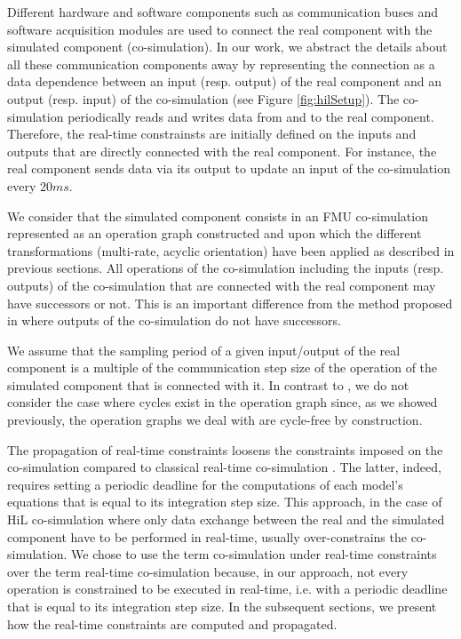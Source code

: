 Different hardware and software components such as communication buses and software acquisition modules are used to connect the real component with the simulated component (co-simulation). In our work, we abstract the details about all these communication components away by representing the connection as a data dependence between an input (resp. output) of the real component and an output (resp. input) of the co-simulation (see Figure \ref{fig:hilSetup}). The co-simulation periodically reads and writes data from and to the real component. Therefore, the real-time constrainsts are initially defined on the inputs and outputs that are directly connected with the real component. For instance, the real component sends data via its output to update an input of the co-simulation every $20ms$.

We consider that the simulated component consists in an FMU co-simulation represented as an operation graph constructed and upon which the different transformations (multi-rate, acyclic orientation) have been applied as described in previous sections. All operations of the co-simulation including the inputs (resp. outputs) of the co-simulation that are connected with the real component may have successors or not. This is an important difference from the method proposed in \cite{faure:2011} where outputs of the co-simulation do not have successors. 

We assume that the sampling period of a given input/output of the real component is a multiple of the communication step size of the operation of the simulated component that is connected with it. In contrast to \cite{faure:2011}, we do not consider the case where cycles exist in the operation graph since, as we showed previously, the operation graphs we deal with are cycle-free by construction. 

The propagation of real-time constraints loosens the constraints imposed on the co-simulation compared to classical real-time co-simulation \cite{belanger:2010}. The latter, indeed, requires setting a periodic deadline for the computations of each model's equations that is equal to its integration step size. This approach, in the case of HiL co-simulation where only data exchange between the real and the simulated component have to be performed in real-time, usually over-constrains the co-simulation. We chose to use the term co-simulation under real-time constraints over the term real-time co-simulation because, in our approach, not every operation is constrained to be executed in real-time, i.e. with a periodic deadline that is equal to its integration step size. In the subsequent sections, we present how the real-time constraints are computed and propagated. %


